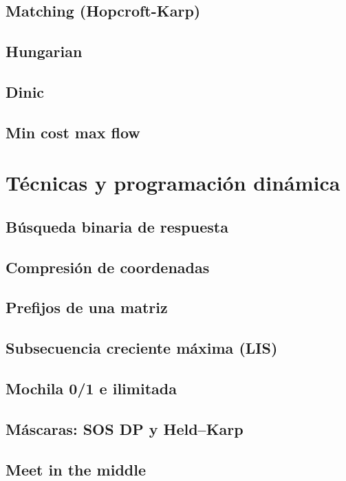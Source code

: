 \subsection{Matching (Hopcroft-Karp)}
\subsection{Hungarian}
\subsection{Dinic}
\subsection{Min cost max flow}

\section{Técnicas y programación dinámica}
\subsection{Búsqueda binaria de respuesta}
\subsection{Compresión de coordenadas}
\subsection{Prefijos de una matriz}
\subsection{Subsecuencia creciente máxima (LIS)}
\subsection{Mochila 0/1 e ilimitada}
\subsection{Máscaras: SOS DP y Held--Karp}
\subsection{Meet in the middle}
